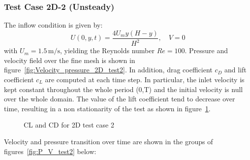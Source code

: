 \documentclass{article}
\begin{document}
\subsubsection{Test Case 2D-2 (Unsteady)}
    The inflow condition is given by:
    \[
    U(0, y, t) = \frac{4U_m y (H - y)}{H^2}, \quad V = 0
    \]
    with \(U_m = 1.5 \, \text{m/s}\), yielding the Reynolds number \(Re = 100\). 
    Pressure and velocity field over the fine mesh is shown in figure~\ref{fig:Velocity_pressure_2D_test2}.
In addition, drag coefficient \(c_D\) and lift coefficient \(c_L\) are computed at each time step. In particular, the inlet velocity is kept constant throughout the whole period (0,T) and the initial velocity is null over the whole domain. The value of the lift coefficient tend to decrease over time, resulting in a non stationarity of the test as shown in figure~\ref{fig:Cd_Cl_2D_test2}.
\begin{figure}
    \centering
    \hfill
\caption{CL and CD for 2D test case 2}
    \label{fig:Cd_Cl_2D_test2}
\end{figure}
Velocity and pressure transition over time are shown in the groups of figures~\ref{fig:P_V_test2} below:
\end{document}
